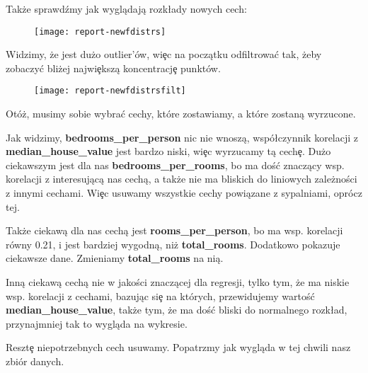 \documentclass{article}
\begin{document}
\noindent
\quad Także sprawdźmy jak wyglądają rozk\l ady nowych cech:

\begin{figure}[h!]
\centering
\texttt{[image: report-newfdistrs]}
\end{figure}

\noindent
\quad Widzimy, że jest dużo outlier'ów, wi\c ec na początku odfiltrowa\'c tak, żeby zobaczy\'c bliżej najwi\c ekszą koncentracj\c e punktów.

\begin{figure}[h!]
\centering
\texttt{[image: report-newfdistrsfilt]}
\end{figure}

\noindent
\quad Otóż, musimy sobie wybra\'c cechy, które zostawiamy, a które zostaną wyrzucone.

\noindent
\quad Jak widzimy, \textbf{bedrooms\_per\_person} nic nie wnoszą, wspó\l czynnik korelacji z \textbf{median\_house\_value} jest bardzo niski, wi\c ec wyrzucamy tą cech\c e. Dużo ciekawszym jest dla nas \textbf{bedrooms\_per\_rooms}, bo ma doś\'c znaczący wsp. korelacji z interesującą nas cechą, a także nie ma bliskich do liniowych zależności z innymi cechami. Wi\c ec usuwamy wszystkie cechy powiązane z sypalniami, oprócz tej.

\noindent
\quad Także ciekawą dla nas cechą jest \textbf{rooms\_per\_person}, bo ma wsp. korelacji równy 0.21, i jest bardziej wygodną, niż \textbf{total\_rooms}. Dodatkowo pokazuje ciekawsze dane. Zmieniamy \textbf{total\_rooms} na nią.

\noindent
\quad Inną ciekawą cechą nie w jakości znaczącej dla regresji, tylko tym, że ma niskie wsp. korelacji z cechami, bazując si\c e na których, przewidujemy wartoś\'c \textbf{median\_house\_value}, także tym, że ma doś\'c bliski do normalnego rozk\l ad, przynajmniej tak to wygląda na wykresie.

\noindent
\quad Reszt\c e niepotrzebnych cech usuwamy. Popatrzmy jak wygląda w tej chwili nasz zbiór danych.
\end{document}
